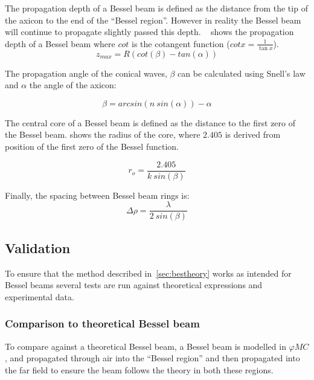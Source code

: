 The propagation depth of a Bessel beam is defined as the distance from the tip of the axicon to the end of the ``Bessel region''. However in reality the Bessel beam will continue to propagate slightly passed this depth.
~ shows the propagation depth of a Bessel beam where $cot$ is the cotangent function ($cot x = \tfrac{1}{\tan x}$).
\begin{equation}
z_{max}=R\left(cot\left(\beta\right) - tan\left(\alpha\right)\right)
\label{eqn:besselzmax}
\end{equation}

The propagation angle of the conical waves, $\beta$ can be calculated using Snell's law and $\alpha$ the angle of the axicon:

\begin{equation}
\beta = arcsin\left(n\ sin\left(\alpha\right)\right)-\alpha
\label{eqn:betaangle}
\end{equation}

The central core of a Bessel beam is defined as the distance to the first zero of the Bessel beam.
 shows the radius of the core, where $2.405$ is derived from position of the first zero of the Bessel function.

\begin{equation}
r_o = \frac{2.405}{k\ sin\left(\beta\right)}
\label{eqn:coreradius}
\end{equation}

Finally, the spacing between Bessel beam rings is:
\begin{equation}
\Delta \rho = \frac{\lambda}{2\ sin\left(\beta\right)}
\end{equation}

\subsection{Validation}

To ensure that the method described in~\cref{sec:bestheory} works as intended for Bessel beams several tests are run against theoretical expressions and experimental data.

\subsubsection*{Comparison to theoretical Bessel beam}

To compare against a theoretical Bessel beam, a Bessel beam is modelled in $\varphi MC$, and propagated through air into the ``Bessel region'' and then propagated into the far field to ensure the beam follows the theory in both these regions.

